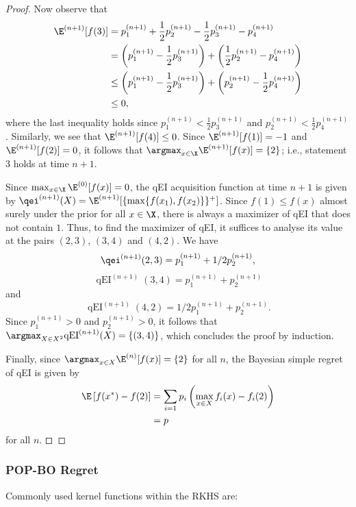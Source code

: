 \documentclass[
  letterpaper,
  DIV=11,
  numbers=noendperiod,
  oneside]{scrreprt}
\theoremstyle{remark}
\begin{document}
\begin{proof}
Now observe that \[\begin{aligned}
    \E^{(n+1)}[f(3)] &= p_1^{(n+1)} + \frac{1}{2}p_2^{(n+1)} - \frac{1}{2}p_3^{(n+1)} - p_4^{(n+1)}\\
    &= \left(p_1^{(n+1)} - \frac{1}{2}p_3^{(n+1)}\right) + \left(\frac{1}{2}p_2^{(n+1)} - p_4^{(n+1)}\right)\\
    &\leq \left(p_1^{(n+1)} - \frac{1}{2}p_3^{(n+1)}\right) + \left(p_2^{(n+1)} - \frac{1}{2}p_4^{(n+1)}\right)\\
    &\leq 0,
\end{aligned}\] where the last inequality holds since
\(p_1^{(n+1)} < \frac{1}{2}p_3^{(n+1)}\) and
\(p_2^{(n+1)} < \frac{1}{2}p_4^{(n+1)}\). Similarly, we see that
\(\E^{(n+1)}[f(4)] \leq 0\). Since \(\E^{(n+1)}[f(1)]=-1\) and
\(\E^{(n+1)}[f(2)]=0\), it follows that
\(\argmax_{x\in\X}\E^{(n+1)}[f(x)]=\{2\}\); i.e., statement 3 holds at
time \(n+1\).

Since \(\max_{x\in\X}\E^{(0)}[f(x)] = 0\), the qEI acquisition function
at time \(n+1\) is given by
\(\qei^{(n+1)}(X) = \E^{(n+1)}[\{\max\{f(x_1), f(x_2)\}\}^+]\). Since
\(f(1) \leq f(x)\) almost surely under the prior for all \(x\in\X\),
there is always a maximizer of qEI that does not contain \(1\). Thus, to
find the maximizer of qEI, it suffices to analyse its value at the pairs
\((2, 3)\), \((3,4)\) and \((4,2)\). We have
\[\qei^{(n+1)}(2, 3) = p_1^{(n+1)} + 1/2 p_2^{(n+1)},\]
\[\operatorname{qEI}^{(n+1)}(3, 4) = p_1^{(n+1)} + p_2^{(n+1)}\] and
\[\operatorname{qEI}^{(n+1)}(4, 2) = 1/2p_1^{(n+1)} + p_2^{(n+1)}.\]
Since \(p_1^{(n+1)} > 0\) and \(p_2^{(n+1)} > 0\), it follows that
\(\argmax_{X \in X^2}\text{qEI}^{(n+1)}(X) = \{(3, 4)\}\), which
concludes the proof by induction.

Finally, since \(\argmax_{x\in X}\E^{(n)}[f(x)]=\{2\}\) for all \(n\),
the Bayesian simple regret of qEI is given by \[\begin{aligned}
    \E\left[f(x^*) - f(2)\right] &= \sum_{i=1}p_i\left(\max_{x\in X}f_i(x) - f_i(2)\right)\\
    &= p
\end{aligned}\] for all \(n\). ◻
\end{proof}

\subsubsection*{POP-BO Regret}\label{pop-bo-regret}

Commonly used kernel functions within the RKHS are:
\end{document}
